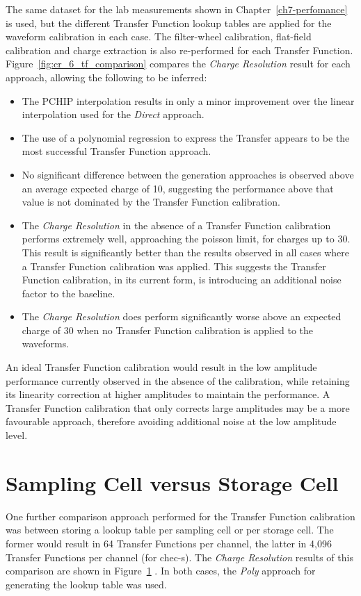The same dataset for the lab measurements shown in Chapter~\ref{ch7-perfomance} is used, but the different Transfer Function lookup tables are applied for the waveform calibration in each case. The filter-wheel calibration, flat-field calibration and charge extraction is also re-performed for each Transfer Function. Figure~\ref{fig:cr_6_tf_comparison} compares the \textit{Charge Resolution} result for each approach, allowing the following to be inferred:
\begin{itemize}
	\item The PCHIP interpolation results in only a minor improvement over the linear interpolation used for the \textit{Direct} approach.
	\item The use of a polynomial regression to express the Transfer appears to be the most successful Transfer Function approach.
	\item No significant difference between the generation approaches is observed above an average expected charge of \SI{10}{\pe}, suggesting the performance above that value is not dominated by the Transfer Function calibration.
	\item The \textit{Charge Resolution} in the absence of a Transfer Function calibration performs extremely well, approaching the poisson limit, for charges up to \SI{30}{\pe}. This result is significantly better than the results observed in all cases where a Transfer Function calibration was applied. This suggests the Transfer Function calibration, in its current form, is introducing an additional noise factor to the baseline.
	\item The \textit{Charge Resolution} does perform significantly worse above an expected charge of \SI{30}{\pe} when no Transfer Function calibration is applied to the waveforms.
\end{itemize}
An ideal Transfer Function calibration would result in the low amplitude performance currently observed in the absence of the calibration, while retaining its linearity correction at higher amplitudes to maintain the performance. A Transfer Function calibration that only corrects large amplitudes may be a more favourable approach, therefore avoiding additional noise at the low amplitude level.

\section{Sampling Cell versus Storage Cell}

One further comparison approach performed for the Transfer Function calibration was between storing a lookup table per sampling cell or per storage cell. The former would result in 64 Transfer Functions per channel, the latter in 4,096 Transfer Functions per channel (for \gls{chec-s}). The \textit{Charge Resolution} results of this comparison are shown in Figure~\ref{} . In both cases, the \textit{Poly} approach for generating the lookup table was used.

